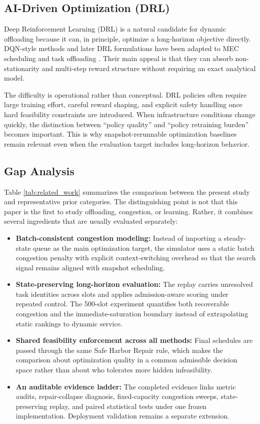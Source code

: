 \documentclass[pdflatex,sn-mathphys-num]{sn-jnl}
\begin{document}
\subsection{AI-Driven Optimization (DRL)}
Deep Reinforcement Learning (DRL) is a natural candidate for dynamic offloading because it can, in principle, optimize a long-horizon objective directly. DQN-style methods \cite{Mnih2015} and later DRL formulations have been adapted to MEC scheduling and task offloading \cite{Huang2020, Tang2022}. Their main appeal is that they can absorb non-stationarity and multi-step reward structure without requiring an exact analytical model.

The difficulty is operational rather than conceptual. DRL policies often require large training effort, careful reward shaping, and explicit safety handling once hard feasibility constraints are introduced. When infrastructure conditions change quickly, the distinction between ``policy quality'' and ``policy retraining burden'' becomes important. This is why snapshot-rerunnable optimization baselines remain relevant even when the evaluation target includes long-horizon behavior.

\subsection{Gap Analysis}
Table \ref{tab:related_work} summarizes the comparison between the present study and representative prior categories. The distinguishing point is not that this paper is the first to study offloading, congestion, or learning. Rather, it combines several ingredients that are usually evaluated separately:
\begin{itemize}
    \item \textbf{Batch-consistent congestion modeling:} Instead of importing a steady-state queue as the main optimization target, the simulator uses a static batch congestion penalty with explicit context-switching overhead so that the search signal remains aligned with snapshot scheduling.
    \item \textbf{State-preserving long-horizon evaluation:} The replay carries unresolved task identities across slots and applies admission-aware scoring under repeated control. The 500-slot experiment quantifies both recoverable congestion and the immediate-saturation boundary instead of extrapolating static rankings to dynamic service.
    \item \textbf{Shared feasibility enforcement across all methods:} Final schedules are passed through the same Safe Harbor Repair rule, which makes the comparison about optimization quality in a common admissible decision space rather than about who tolerates more hidden infeasibility.
    \item \textbf{An auditable evidence ladder:} The completed evidence links metric audits, repair-collapse diagnosis, fixed-capacity congestion sweeps, state-preserving replay, and paired statistical tests under one frozen implementation. Deployment validation remains a separate extension.
\end{itemize}
\end{document}
